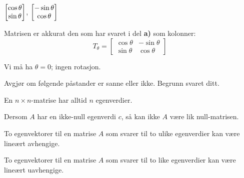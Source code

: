 \begin{losning}

\begin{punkt}
$\begin{bmatrix} \cos\theta \\ \sin\theta \end{bmatrix}$, $\begin{bmatrix} -\sin\theta \\ \cos\theta \end{bmatrix}$
\end{punkt}

\begin{punkt}
Matrisen er akkurat den som har svaret i del \textbf{a)} som kolonner:
$$T_\theta=\begin{bmatrix}
\cos\theta & -\sin\theta\\
\sin\theta & \cos\theta
\end{bmatrix}$$
\end{punkt}

\begin{punkt}
Vi må ha $\theta=0$; ingen rotasjon.
\end{punkt}

\end{losning}

\begin{oppgave}
Avgjør om følgende påstander er sanne eller ikke. Begrunn svaret ditt.

\begin{punkt}
En $n\times n$-matrise har alltid $n$ egenverdier.
\end{punkt}

\begin{punkt}
Dersom $A$ har en ikke-null egenverdi $c$, så kan ikke $A$ være lik null-matrisen.
\end{punkt}

\begin{punkt}
To egenvektorer til en matrise $A$ som svarer til to ulike egenverdier kan være lineært avhengige.
\end{punkt}

\begin{punkt}
To egenvektorer til en matrise $A$ som svarer til to like egenverdier kan være lineært uavhengige.
\end{punkt}



\end{oppgave}

